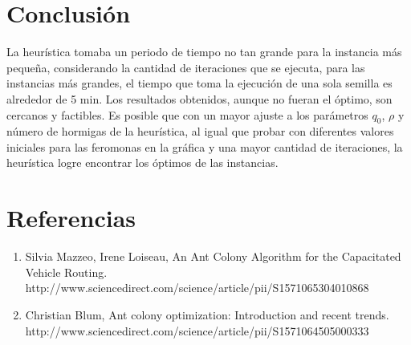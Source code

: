 \documentclass[12pt]{article}
\begin{document}
	\section{Conclusión}

	La heurística tomaba un periodo de tiempo no tan grande para la instancia más 
	pequeña, considerando la cantidad de iteraciones que se ejecuta, para las instancias más grandes, el tiempo que toma la ejecución de una sola semilla es
	alrededor de 5 min.
	Los resultados obtenidos, aunque no fueran el óptimo, son cercanos y factibles. 
	Es posible que con un mayor ajuste a los parámetros $q_0$, $\rho$ y número de 
	hormigas de la heurística, al igual que probar con diferentes valores iniciales
	para las feromonas en la gráfica  y una mayor cantidad de iteraciones, la heurística logre encontrar los óptimos de las instancias.
	\section{Referencias}
	\begin{enumerate}
		\item Silvia Mazzeo, Irene Loiseau, An Ant Colony Algorithm for the Capacitated Vehicle Routing. http://www.sciencedirect.com/science/article/pii/S1571065304010868
		
		\item Christian Blum, Ant colony optimization: Introduction and recent trends.\\
		http://www.sciencedirect.com/science/article/pii/S1571064505000333
		
	\end{enumerate}
\end{document}
